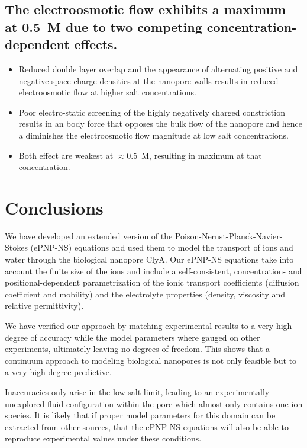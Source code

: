 \documentclass[journal=ancac3,manuscript=article,etalmode=truncate,maxauthors=0,layout=onecolumn]{achemso}
\begin{document}
\subsection{The electroosmotic flow exhibits a maximum at 0.5~M due to two competing concentration-dependent
effects.}

\begin{itemize}
  \item Reduced double layer overlap and the appearance of alternating positive and negative space charge
  densities at the nanopore walls results in reduced electroosmotic flow at higher salt concentrations.
  \item Poor electro-static screening of the highly negatively charged \trans{} constriction
  results in an body force that opposes the bulk flow of the nanopore and hence a diminishes the
  electroosmotic flow magnitude at low salt concentrations.
  \item Both effect are weakest at $\approx0.5$~M, resulting in maximum at that concentration.
\end{itemize}

\section{Conclusions}\label{sec:conclusions}

We have developed an extended version of the Poison-Nernst-Planck-Navier-Stokes
(ePNP-NS) equations and used them to model the transport of ions and water
through the biological nanopore ClyA. Our ePNP-NS equations take into account
the finite size of the ions and include a self-consistent, concentration- and
positional-dependent parametrization of the ionic transport coefficients
(diffusion coefficient and mobility) and the electrolyte properties (density,
viscosity and relative permittivity).

We have verified our approach by matching experimental results to a very high
degree of accuracy while the model parameters where gauged on other experiments,
ultimately leaving no degrees of freedom. This shows that a continuum approach
to modeling biological nanopores is not only feasible but to a very high degree
predictive.

Inaccuracies only arise in the low salt limit, leading to an experimentally
unexplored fluid configuration within the pore which almost only contains one
ion species. It is likely that if proper model parameters for this domain can be
extracted from other sources, that the ePNP-NS equations will also be able to
reproduce experimental values under these conditions.
\end{document}
